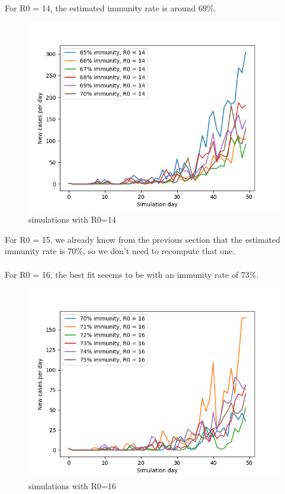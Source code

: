 \documentclass[runningheads]{llncs}
\begin{document}
\newpage
\noindent
For R0 = 14, the estimated immunity rate is around 69\%.
\begin{figure}
	\includegraphics[width=\textwidth]{test_R0_14.png}
	\caption{simulations with R0=14}
\end{figure}

\newpage
\noindent
For R0 = 15, we already know from the previous section that the estimated immunity rate is 70\%, so we don't need to recompute that one.
\\
\\
\noindent
For R0 = 16, the best fit seeems to be with an immunity rate of 73\%.
\begin{figure}
	\includegraphics[width=\textwidth]{test_R0_16.png}
	\caption{simulations with R0=16}
\end{figure}
\end{document}
